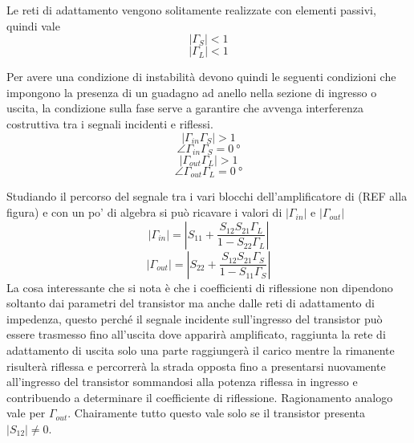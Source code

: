 \documentclass[12pt]{article}
\begin{document}
Le reti di adattamento vengono solitamente realizzate con elementi passivi, quindi vale
\begin{equation}
    \left|\Gamma_{S}\right| < 1
\end{equation}
\begin{equation}
    \left|\Gamma_{L}\right| < 1
\end{equation}

Per avere una condizione di instabilità devono quindi le seguenti condizioni che impongono la presenza di un guadagno ad anello nella sezione di ingresso o uscita, la condizione sulla fase serve a garantire che avvenga interferenza costruttiva tra i segnali incidenti e riflessi.
\begin{equation}
    \left|\Gamma_{in}\Gamma_{S}\right| > 1
\end{equation}
\begin{equation}
    \angle\Gamma_{in}\Gamma_{S} = \SI{0}{\degree}
\end{equation}
\begin{equation}
    \left|\Gamma_{out}\Gamma_{L}\right| > 1
\end{equation}
\begin{equation}
    \angle\Gamma_{out}\Gamma_{L} = \SI{0}{\degree}
\end{equation}

Studiando il percorso del segnale tra i vari blocchi dell'amplificatore di (REF alla figura) e con un po' di algebra si può ricavare i valori di $\left|\Gamma_{in}\right|$ e $\left|\Gamma_{out}\right|$
\begin{equation}
    \left|\Gamma_{in}\right| = \left|S_{11} + \dfrac{S_{12}S_{21}\Gamma_{L}}{1-S_{22}\Gamma_{L}}\right|
\end{equation}
\begin{equation}
    \left|\Gamma_{out}\right| = \left|S_{22} + \dfrac{S_{12}S_{21}\Gamma_{S}}{1-S_{11}\Gamma_{S}}\right|
\end{equation}
La cosa interessante che si nota è che i coefficienti di riflessione non dipendono soltanto dai parametri del transistor ma anche dalle reti di adattamento di impedenza, questo perché il segnale incidente sull'ingresso del transistor può essere trasmesso fino all'uscita dove apparirà amplificato, raggiunta la rete di adattamento di uscita solo una parte raggiungerà il carico mentre la rimanente risulterà riflessa e percorrerà la strada opposta fino a presentarsi nuovamente all'ingresso del transistor sommandosi alla potenza riflessa in ingresso e contribuendo a determinare il coefficiente di riflessione. Ragionamento analogo vale per $\Gamma_{out}$. Chairamente tutto questo vale solo se il transistor presenta $\left|S_{12}\right|\neq 0$.
\end{document}
